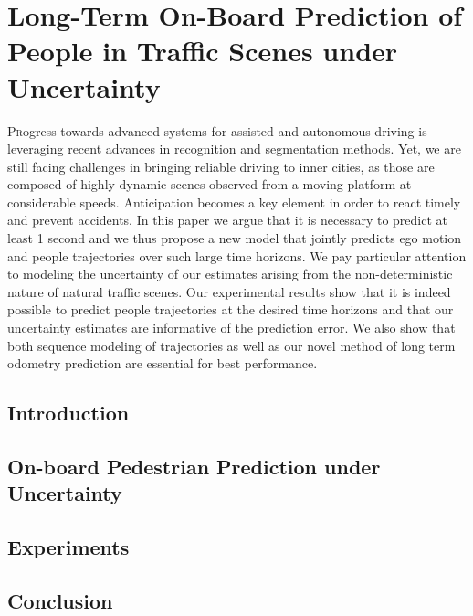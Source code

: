 \chapter[Long-Term On-Board Prediction of People in Traffic Scenes under Uncertainty]{Long-Term On-Board Prediction of People in Traffic Scenes under Uncertainty}
\label{chap:cvpr18_2}
\minitoc\vspace{2ex}
\lettrine[lines=3]{P}{r}ogress towards advanced systems for assisted and autonomous driving is leveraging  recent advances in recognition and segmentation methods. Yet, we are still facing challenges in bringing reliable driving to inner cities, as those are composed of highly dynamic scenes observed from a moving platform at considerable speeds. Anticipation becomes a key element in order to react timely and prevent accidents. 
    In this paper we argue that it is necessary to predict at least 1 second and we thus propose a new model that jointly predicts ego motion and people trajectories over such large time horizons. We pay particular attention to modeling the uncertainty of our estimates arising from the non-deterministic nature of natural traffic scenes.
    Our experimental results show that it is indeed possible to predict people trajectories at the desired time horizons and that our uncertainty estimates are informative of the prediction error. We also show that both sequence modeling of trajectories as well as our novel method of long term odometry prediction are essential for best performance.
\section{Introduction}
\label{sec:aaai18:intro}




\section{On-board Pedestrian Prediction under Uncertainty} 
\label{sec:cvpr18_2:model}


\section{Experiments}
\label{sec:cvpr18_2:experiments}


\section{Conclusion}
\label{sec:aaa18:conclusion}
